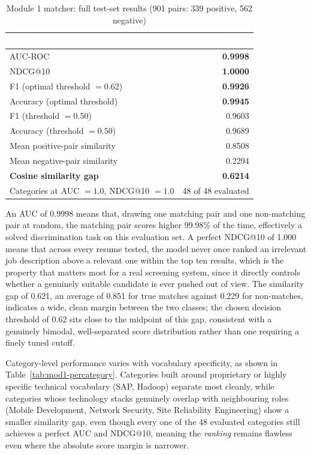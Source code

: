 \documentclass[11pt,a4paper]{article}
\newcommand{\hdrow}{\rowcolor{TPnavy}}
\newcommand{\hdtxt}[1]{\textcolor{white}{\bfseries #1}}
\begin{document}
\begin{table}[H]
\centering
\caption{Module 1 matcher: full test-set results (901 pairs: 339 positive, 562 negative)}
\label{tab:mod1-results}
\small
\begin{tabular}{lr}
\toprule
\hdrow \hdtxt{Metric} & \hdtxt{Value} \\
\midrule
AUC-ROC & \textbf{0.9998} \\
\rowcolor{TPlight}
NDCG@10 & \textbf{1.0000} \\
F1 (optimal threshold $=0.62$) & \textbf{0.9926} \\
\rowcolor{TPlight}
Accuracy (optimal threshold) & \textbf{0.9945} \\
F1 (threshold $=0.50$) & 0.9603 \\
\rowcolor{TPlight}
Accuracy (threshold $=0.50$) & 0.9689 \\
Mean positive-pair similarity & 0.8508 \\
\rowcolor{TPlight}
Mean negative-pair similarity & 0.2294 \\
\textbf{Cosine similarity gap} & \textbf{0.6214} \\
\rowcolor{TPlight}
Categories at AUC $=1.0$, NDCG@10 $=1.0$ & 48 of 48 evaluated \\
\bottomrule
\end{tabular}
\end{table}

An AUC of 0.9998 means that, drawing one matching pair and one non-matching pair at random, the matching pair scores higher 99.98\% of the time, effectively a solved discrimination task on this evaluation set. A perfect NDCG@10 of 1.000 means that across every resume tested, the model never once ranked an irrelevant job description above a relevant one within the top ten results, which is the property that matters most for a real screening system, since it directly controls whether a genuinely suitable candidate is ever pushed out of view. The similarity gap of 0.621, an average of 0.851 for true matches against 0.229 for non-matches, indicates a wide, clean margin between the two classes; the chosen decision threshold of 0.62 sits close to the midpoint of this gap, consistent with a genuinely bimodal, well-separated score distribution rather than one requiring a finely tuned cutoff.

Category-level performance varies with vocabulary specificity, as shown in Table~\ref{tab:mod1-percategory}. Categories built around proprietary or highly specific technical vocabulary (SAP, Hadoop) separate most cleanly, while categories whose technology stacks genuinely overlap with neighbouring roles (Mobile Development, Network Security, Site Reliability Engineering) show a smaller similarity gap, even though every one of the 48 evaluated categories still achieves a perfect AUC and NDCG@10, meaning the \emph{ranking} remains flawless even where the absolute score margin is narrower.
\end{document}
